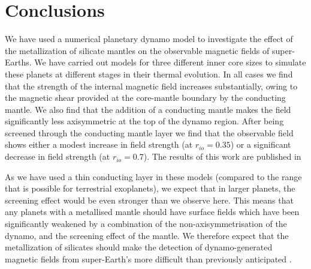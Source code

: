 \section{Conclusions}

We have used a numerical planetary dynamo model to investigate the effect of the metallization of silicate mantles on the observable magnetic fields of super-Earths. We have carried out models for three different inner core sizes to simulate these planets at different stages in their thermal evolution. In all cases we find that the strength of the internal magnetic field increases substantially, owing to the magnetic shear provided at the core-mantle boundary by the conducting mantle. We also find that the addition of a conducting mantle makes the field significantly less axisymmetric at the top of the dynamo region. After being screened through the conducting mantle layer we find that the observable field shows either a modest increase in field strength (at $r_{io}=0.35$) or a significant decrease in field strength (at $r_{io}=0.7$). The results of this work are published in \citet{vilim2013}

As we have used a thin conducting layer in these models (compared to the range that is possible for terrestrial exoplanets), we expect that in larger planets, the screening effect would be even stronger than we observe here. This means that any planets with a metallised mantle should have surface fields which have been significantly weakened by a combination of the non-axisymmetrisation of the dynamo, and the screening effect of the mantle. We therefore expect that the metallization of silicates should make the detection of dynamo-generated magnetic fields from super-Earth's more difficult than previously anticipated \citep{driscoll2011}.










